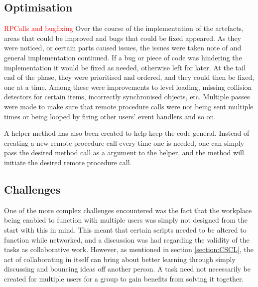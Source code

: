 \subsection{Optimisation} \label{subsec:Optimisation}
\textcolor{red}{RPCalls and bugfixing}
Over the course of the implementation of the artefacts, areas that could be improved and bugs that could be fixed appeared. As they were noticed, or certain parts caused issues, the issues were taken note of and general implementation continued. If a bug or piece of code was hindering the implementation it would be fixed as needed, otherwise left for later. At the tail end of the phase, they were prioritised and ordered, and they could then be fixed, one at a time. Among these were improvements to level loading, missing collision detectors for certain items, incorrectly synchronised objects, etc. Multiple passes were made to make sure that remote procedure calls were not being sent multiple times or being looped by firing other users' event handlers and so on. 

A helper method has also been created to help keep the code general. Instead of creating a new remote procedure call every time one is needed, one can simply pass the desired method call as a argument to the helper, and the method will initiate the desired remote procedure call. 



\subsection{Challenges}
One of the more complex challenges encountered was the fact that the workplace being enabled to function with multiple users was simply not designed from the start with this in mind. This meant that certain scripts needed to be altered to function while networked, and a discussion was had regarding the validity of the tasks as collaborative work. However, as mentioned in section \ref{section:CSCL}, the act of collaborating in itself can bring about better learning through simply discussing and bouncing ideas off another person. A task need not necessarily be created for multiple users for a group to gain benefits from solving it together.

